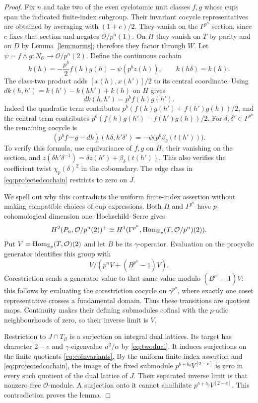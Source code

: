 \begin{proof}
Fix $n$ and take two of the even cyclotomic unit classes $f,g$
whose cups span the indicated finite-index subgroup. Their invariant cocycle
representatives are obtained by averaging with $(1+c)/2$.
They vanish on the $\Gamma^{p^n}$ section, since $c$ fixes
that section and negates $\mathcal O/p^n(1)$. On $H$ they
vanish on $T$ by parity and on $D$ by Lemma~\ref{lem:norms};
therefore they factor through $W$.
Let $\psi=f\wedge g:N_{\mathcal O}\to\mathcal O/p^n(2)$.
Define the continuous cochain
\[
 k(h)=-\frac{p^b}{2}f(h)g(h)-\psi(p^b z(h)),\qquad
 k(h\delta)=k(h).
\]
The class-two product adds $[x(h),x(h')]/2$ to its central
coordinate. Using $dk(h,h')=k(h')-k(hh')+k(h)$ on $H$
gives
\[
                       dk(h,h')=p^bf(h)g(h').
\]
Indeed the quadratic term contributes
$p^b(f(h)g(h')+f(h')g(h))/2$, and the central term contributes
$p^b(f(h)g(h')-f(h')g(h))/2$.
For $\delta,\delta'\in\Gamma^{p^n}$ the remaining cocycle is
\begin{equation}
 (p^bf\smile g-dk)(h\delta,h'\delta')
       =-\psi\bigl(p^b\beta_\delta(t(h'))\bigr).
 \label{eq:projectedcochain}
\end{equation}
To verify this formula, use equivariance of $f,g$ on $H$,
their vanishing on the section, and
$z(\delta h'\delta^{-1})=\delta z(h')+
\beta_\delta(t(h'))$. This also verifies the coefficient
twist $\chi_p(\delta)^2$ in the coboundary.
The edge class in \eqref{eq:projectedcochain} restricts to zero
on $J$.

We spell out why this contradicts the uniform finite-index assertion
without making compatible choices of cup expressions.
Both $H$ and $\Gamma^{p^n}$ have $p$-cohomological dimension
one. Hochschild--Serre gives
\[
 H^2(P_n,\mathcal O/p^n(2))^+
 \simeq H^1(\Gamma^{p^n},
             \operatorname{Hom}_{\mathbb Z_p}(T,\mathcal O/p^n)(2)).
\]
Put $V=\operatorname{Hom}_{\mathbb Z_p}(T,\mathcal O)(2)$ and let $B$ be its
$\gamma$-operator. Evaluation on the procyclic generator
identifies this group with
\begin{equation}
             V/(p^nV+(B^{p^n}-1)V).
             \label{eq:coinvariants}
\end{equation}
Corestriction sends a generator value to that same value
modulo $(B^{p^n}-1)V$: this follows by evaluating the
corestriction cocycle on $\gamma^{p^n}$, where exactly one
coset representative crosses a fundamental domain.
Thus these transitions are quotient maps.
Continuity makes their defining submodules cofinal with the
$p$-adic neighbourhoods of zero, so their inverse limit is $V$.

Restriction to $J\cap T_{\mathcal O}$ is a surjection on
integral dual lattices. Its target has character $2-e$ and
$\gamma$-eigenvalue $u^2/\alpha$ by \eqref{eq:twodual}.
It induces surjections on the finite quotients
\eqref{eq:coinvariants}. By the uniform finite-index assertion and
\eqref{eq:projectedcochain}, the image of the fixed submodule
$p^{b+b_0}V^{[2-e]}$ is zero in every such quotient of the dual
lattice of $J$. Their separated inverse limit is that
nonzero free $\mathcal O$-module. A surjection onto it cannot
annihilate $p^{b+b_0}V^{[2-e]}$. This contradiction proves the lemma.
\end{proof}

